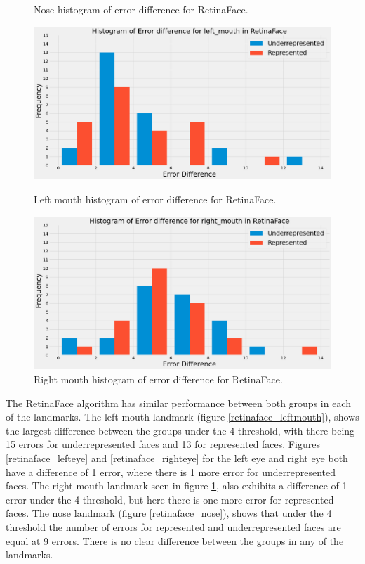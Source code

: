 \documentclass{l4proj}
\begin{document}
\begin{figure}[h!]
\begin{minipage}{0.51\textwidth}
    \caption{Nose histogram of error difference for RetinaFace.}
    \label{retinaface_nose}
  \end{minipage}
    \hfill
  \begin{minipage}{0.49\textwidth}
    \includegraphics[width=\textwidth]{images/retinaface_leftmouth.png}
    \caption{Left mouth histogram of error difference for RetinaFace.}
    \label{retinaface_leftmouth}
  \end{minipage} 
      \hfill
    \begin{minipage}{0.49\textwidth}
    \includegraphics[width=\textwidth]{images/retinaface_rightmouth.png}
    \caption{Right mouth histogram of error difference for RetinaFace.}
    \label{retinaface_rightmouth}
  \end{minipage} 
 
\end{figure}

The RetinaFace algorithm has similar performance between both groups in each of the landmarks. The left mouth landmark (figure \ref{retinaface_leftmouth}), shows the largest difference between the groups under the 4 threshold, with there being 15 errors for underrepresented faces and 13 for represented faces. Figures \ref{retinaface_lefteye} and \ref{retinaface_righteye} for the left eye and right eye both have a difference of 1 error, where there is 1 more error for underrepresented faces. The right mouth landmark seen in figure \ref{retinaface_rightmouth}, also exhibits a difference of 1 error under the 4 threshold, but here there is one more error for represented faces. The nose landmark (figure \ref{retinaface_nose}), shows that under the 4 threshold the number of errors for represented and underrepresented faces are equal at 9 errors. There is no clear difference between the groups in any of the landmarks.
\end{document}
